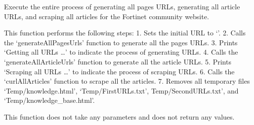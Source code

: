 \documentclass[letterpaper,10pt,english]{sphinxmanual}
\begin{document}
\begin{fulllineitems}
\label{\detokenize{Project.Script:Project.Script.RecupKbFortinet.main}}
\pysigstartsignatures
{}
\pysigstopsignatures
\sphinxAtStartPar
Execute the entire process of generating all pages URLs, generating all article URLs, and scraping all articles for the Fortinet community website.

\sphinxAtStartPar
This function performs the following steps:
1. Sets the initial URL to ‘’.
2. Calls the ‘generateAllPagesUrls’ function to generate all the pages URLs.
3. Prints ‘Getting all URLs …’ to indicate the process of generating URLs.
4. Calls the ‘generateAllArticleUrls’ function to generate all the article URLs.
5. Prints ‘Scraping all URLs …’ to indicate the process of scraping URLs.
6. Calls the ‘curlAllArticles’ function to scrape all the articles.
7. Removes all temporary files ‘Temp/knowledge.html’, ‘Temp/FirstURLs.txt’, Temp/SecondURLs.txt’, and ‘Temp/knowledge\_base.html’.

\sphinxAtStartPar
This function does not take any parameters and does not return any values.

\end{fulllineitems}

\end{document}
